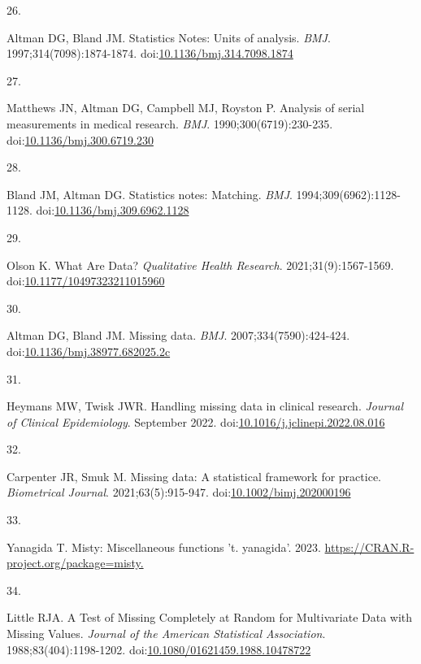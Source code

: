 \documentclass[
]{book}
\newlength{\cslhangindent}
\newlength{\csllabelwidth}
\newlength{\cslentryspacingunit} %
\newenvironment{CSLReferences}[2] %
 {%
  \setlength{\parindent}{0pt}
  \ifodd #1
  \let\oldpar\par
  \def\par{\hangindent=\cslhangindent\oldpar}
  \fi
  \setlength{\parskip}{#2\cslentryspacingunit}
 }%
 {}
\newcommand{\CSLLeftMargin}[1]{\parbox[t]{\csllabelwidth}{#1}}
\newcommand{\CSLRightInline}[1]{\parbox[t]{\linewidth - \csllabelwidth}{#1}\break}
\begin{document}
\begin{CSLReferences}{0}{0}
\leavevmode{}%
\CSLLeftMargin{26. }%
\CSLRightInline{Altman DG, Bland JM. Statistics Notes: Units of analysis. \emph{BMJ}. 1997;314(7098):1874-1874. doi:\href{https://doi.org/10.1136/bmj.314.7098.1874}{10.1136/bmj.314.7098.1874}}

\leavevmode{}%
\CSLLeftMargin{27. }%
\CSLRightInline{Matthews JN, Altman DG, Campbell MJ, Royston P. Analysis of serial measurements in medical research. \emph{BMJ}. 1990;300(6719):230-235. doi:\href{https://doi.org/10.1136/bmj.300.6719.230}{10.1136/bmj.300.6719.230}}

\leavevmode{}%
\CSLLeftMargin{28. }%
\CSLRightInline{Bland JM, Altman DG. Statistics notes: Matching. \emph{BMJ}. 1994;309(6962):1128-1128. doi:\href{https://doi.org/10.1136/bmj.309.6962.1128}{10.1136/bmj.309.6962.1128}}

\leavevmode{}%
\CSLLeftMargin{29. }%
\CSLRightInline{Olson K. What Are Data? \emph{Qualitative Health Research}. 2021;31(9):1567-1569. doi:\href{https://doi.org/10.1177/10497323211015960}{10.1177/10497323211015960}}

\leavevmode{}%
\CSLLeftMargin{30. }%
\CSLRightInline{Altman DG, Bland JM. Missing data. \emph{BMJ}. 2007;334(7590):424-424. doi:\href{https://doi.org/10.1136/bmj.38977.682025.2c}{10.1136/bmj.38977.682025.2c}}

\leavevmode{}%
\CSLLeftMargin{31. }%
\CSLRightInline{Heymans MW, Twisk JWR. Handling missing data in clinical research. \emph{Journal of Clinical Epidemiology}. September 2022. doi:\href{https://doi.org/10.1016/j.jclinepi.2022.08.016}{10.1016/j.jclinepi.2022.08.016}}

\leavevmode{}%
\CSLLeftMargin{32. }%
\CSLRightInline{Carpenter JR, Smuk M. Missing data: A statistical framework for practice. \emph{Biometrical Journal}. 2021;63(5):915-947. doi:\href{https://doi.org/10.1002/bimj.202000196}{10.1002/bimj.202000196}}

\leavevmode{}%
\CSLLeftMargin{33. }%
\CSLRightInline{Yanagida T. Misty: Miscellaneous functions 't. yanagida'. 2023. \href{https://CRAN.R-project.org/package=misty}{https://CRAN.R-project.org/package=misty.}}

\leavevmode{}%
\CSLLeftMargin{34. }%
\CSLRightInline{Little RJA. A Test of Missing Completely at Random for Multivariate Data with Missing Values. \emph{Journal of the American Statistical Association}. 1988;83(404):1198-1202. doi:\href{https://doi.org/10.1080/01621459.1988.10478722}{10.1080/01621459.1988.10478722}}


\end{CSLReferences}
\end{document}
